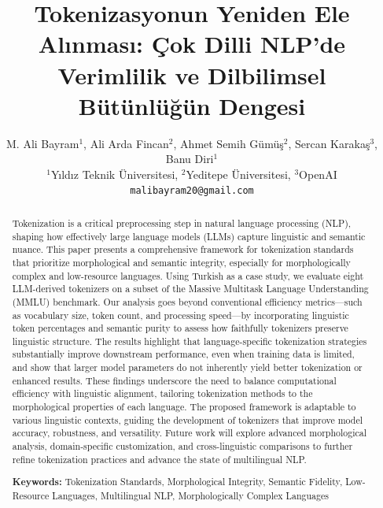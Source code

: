 \documentclass{article}
\title{Tokenizasyonun Yeniden Ele Alınması: Çok Dilli NLP'de Verimlilik ve Dilbilimsel Bütünlüğün Dengesi}
\author{
M. Ali Bayram$^1$, Ali Arda Fincan$^2$, Ahmet Semih Gümüş$^2$, Sercan Karakaş$^3$, Banu Diri$^1$\\
$^1$Yıldız Teknik Üniversitesi, $^2$Yeditepe Üniversitesi, $^3$OpenAI \\
\texttt{malibayram20@gmail.com}
}
\begin{document}
\maketitle

\begin{abstract}
  Tokenization is a critical preprocessing step in natural language processing (NLP), shaping how effectively large language models (LLMs) capture linguistic and semantic nuance. This paper presents a comprehensive framework for tokenization standards that prioritize morphological and semantic integrity, especially for morphologically complex and low-resource languages. Using Turkish as a case study, we evaluate eight LLM-derived tokenizers on a subset of the Massive Multitask Language Understanding (MMLU) benchmark. Our analysis goes beyond conventional efficiency metrics—such as vocabulary size, token count, and processing speed—by incorporating linguistic token percentages and semantic purity to assess how faithfully tokenizers preserve linguistic structure. The results highlight that language-specific tokenization strategies substantially improve downstream performance, even when training data is limited, and show that larger model parameters do not inherently yield better tokenization or enhanced results. These findings underscore the need to balance computational efficiency with linguistic alignment, tailoring tokenization methods to the morphological properties of each language. The proposed framework is adaptable to various linguistic contexts, guiding the development of tokenizers that improve model accuracy, robustness, and versatility. Future work will explore advanced morphological analysis, domain-specific customization, and cross-linguistic comparisons to further refine tokenization practices and advance the state of multilingual NLP.
  
  \textbf{Keywords:} Tokenization Standards, Morphological Integrity, Semantic Fidelity, Low-Resource Languages, Multilingual NLP, Morphologically Complex Languages
  \end{abstract}

\newenvironment{ozet}{
\begin{center}
\begin{minipage}{0.85\textwidth} %
\section*{Özet}
}{
\end{minipage}
\end{center}
}
\end{document}
